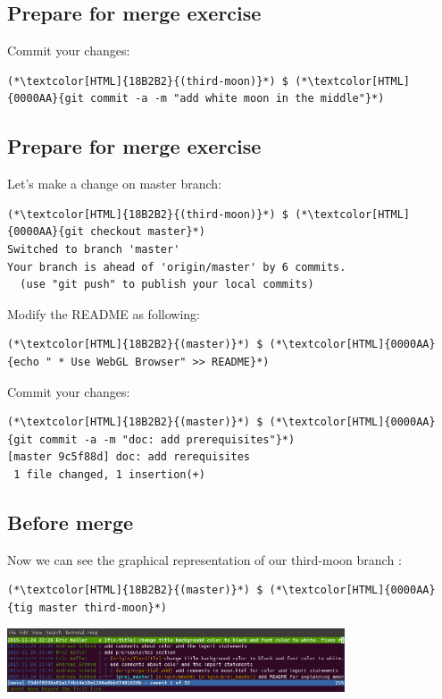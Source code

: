 \subsection{Prepare for merge exercise}
\begin{frame}[fragile]
  \subslidetitle

  Commit your changes:
  \begin{lstlisting}
(*\textcolor[HTML]{18B2B2}{(third-moon)}*) $ (*\textcolor[HTML]{0000AA}{git commit -a -m "add white moon in the middle"}*)
\end{lstlisting}

\end{frame}


\subsection{Prepare for merge exercise}
\begin{frame}[fragile]
  \subslidetitle

  Let's make a change on master branch:
  \begin{lstlisting}
(*\textcolor[HTML]{18B2B2}{(third-moon)}*) $ (*\textcolor[HTML]{0000AA}{git checkout master}*)
Switched to branch 'master'
Your branch is ahead of 'origin/master' by 6 commits.
  (use "git push" to publish your local commits)
\end{lstlisting}

  Modify the README as following:
  \begin{lstlisting}
(*\textcolor[HTML]{18B2B2}{(master)}*) $ (*\textcolor[HTML]{0000AA}{echo " * Use WebGL Browser" >> README}*)
\end{lstlisting}

  Commit your changes:
  \begin{lstlisting}
(*\textcolor[HTML]{18B2B2}{(master)}*) $ (*\textcolor[HTML]{0000AA}{git commit -a -m "doc: add prerequisites"}*)
[master 9c5f88d] doc: add rerequisites
 1 file changed, 1 insertion(+)
\end{lstlisting}

\end{frame}
\subsection{Before merge}
\begin{frame}[fragile]
  \subslidetitle

  Now we can see the graphical representation of our third-moon branch :
  \begin{lstlisting}
(*\textcolor[HTML]{18B2B2}{(master)}*) $ (*\textcolor[HTML]{0000AA}{tig master third-moon}*)
\end{lstlisting}

  \vspace{1em}

  \centerline{\includegraphics[width=10cm]{../screen/tig-fix-title-rebase-master.png}}

\end{frame}


